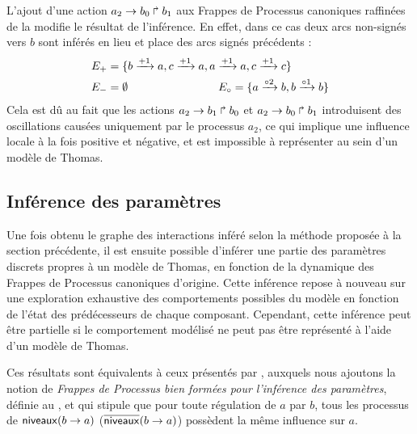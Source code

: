 \begin{example}
  L'ajout d'une action $a_2\rightarrow b_0\Rsh b_1$ aux Frappes de Processus canoniques raffinées
  de la  modifie le résultat de l'inférence.
  En effet, dans ce cas deux arcs non-signés vers $b$ sont inférés en lieu et place
  des arcs signés précédents :
  \begin{align*}
    E_+ &= \{b \xrightarrow{+ 1} a, c \xrightarrow{+ 1} a, a \xrightarrow{+ 1} a, c \xrightarrow{+ 1} c\}\\
    E_- &= \emptyset \qquad\qquad\qquad\qquad
    E_\circ = \{a \xrightarrow{\circ 2} b, b \xrightarrow{\circ 1} b\}
  \end{align*}
  Cela est dû au fait que les actions $a_2\rightarrow b_1\Rsh b_0$ et $a_2\rightarrow b_0\Rsh b_1$
  introduisent des oscillations causées uniquement par le processus $a_2$,
  ce qui implique une influence locale à la fois positive et négative,
  et est impossible à représenter au sein d'un modèle de Thomas.
\end{example}



\subsection{Inférence des paramètres}

Une fois obtenu le graphe des interactions inféré selon la méthode proposée à la section
précédente, il est ensuite possible d'inférer une partie des paramètres discrets
propres à un modèle de Thomas, en fonction de la dynamique des Frappes de Processus canoniques
d'origine.
Cette inférence repose à nouveau sur une exploration exhaustive des comportements possibles
du modèle en fonction de l'état des prédécesseurs de chaque composant.
Cependant, cette inférence peut être partielle si le comportement modélisé
ne peut pas être représenté à l'aide d'un modèle de Thomas.

Ces résultats sont équivalents à ceux présentés par ,
auxquels nous ajoutons la notion de \emph{Frappes de Processus bien formées
pour l'inférence des paramètres}, définie au ,
et qui stipule que pour toute régulation de $a$ par $b$,
tous les processus de $\mathsf{niveaux}(b\rightarrow a)$ (\resp $\overline{\mathsf{niveaux}}(b\rightarrow a)$)
possèdent la même influence sur $a$.

